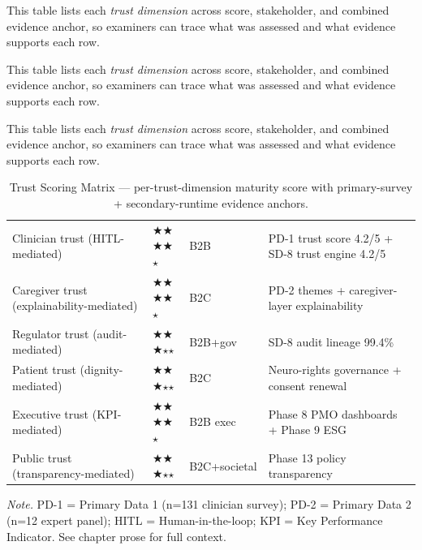 \noindent This table lists each \textit{trust dimension} across score, stakeholder, and combined evidence anchor, so examiners can trace what was assessed and what evidence supports each row.



\noindent This table lists each \textit{trust dimension} across score, stakeholder, and combined evidence anchor, so examiners can trace what was assessed and what evidence supports each row.


\noindent This table lists each \textit{trust dimension} across score, stakeholder, and combined evidence anchor, so examiners can trace what was assessed and what evidence supports each row.



{\tablestripes\tablefontsize
{}
\begin{xltabular}{\textwidth}{@{} >{\raggedright\arraybackslash}p{2.6cm} >{\centering\arraybackslash}p{2.0cm} >{\centering\arraybackslash}p{1.8cm} L @{}}
\caption[Trust Scoring Matrix ($\bigstar$ 0--5)]{Trust Scoring Matrix --- per-trust-dimension maturity score with primary-survey + secondary-runtime evidence anchors.}\label{tab:ch5_trust_score} \\
\toprule
{} &  &  &  \\
\midrule
\endfirsthead
\endhead
\bottomrule
\endlastfoot
Clinician trust (HITL-mediated) & $\bigstar$$\bigstar$$\bigstar$$\bigstar$$\star$ & B2B & PD-1 trust score 4.2/5 + SD-8 trust engine 4.2/5 \\
Caregiver trust (explainability-mediated) & $\bigstar$$\bigstar$$\bigstar$$\bigstar$$\star$ & B2C & PD-2 themes + caregiver-layer explainability \\
Regulator trust (audit-mediated) & $\bigstar$$\bigstar$$\bigstar$$\star$$\star$ & B2B+gov & SD-8 audit lineage 99.4\% \\
Patient trust (dignity-mediated) & $\bigstar$$\bigstar$$\bigstar$$\star$$\star$ & B2C & Neuro-rights governance + consent renewal \\
Executive trust (KPI-mediated) & $\bigstar$$\bigstar$$\bigstar$$\bigstar$$\star$ & B2B exec & Phase 8 PMO dashboards + Phase 9 ESG \\
Public trust (transparency-mediated) & $\bigstar$$\bigstar$$\bigstar$$\star$$\star$ & B2C+societal & Phase 13 policy transparency \\
\end{xltabular}}
\vspace{0.3em}\noindent\textit{Note.} PD-1 = Primary Data 1 (n=131 clinician survey); PD-2 = Primary Data 2 (n=12 expert panel); HITL = Human-in-the-loop; KPI = Key Performance Indicator. See chapter prose for full context.

